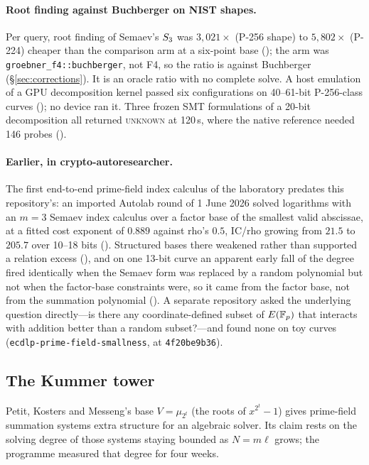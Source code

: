 \paragraph{Root finding against Buchberger on NIST shapes.} Per query, root
finding of Semaev's $S_{3}$ was $3{,}021\times$ (P-256 shape) to
$5{,}802\times$ (P-224) cheaper than the comparison arm at a six-point base
(); the arm was
\texttt{groebner\_f4::buchberger}, not F4, so the ratio is against
Buchberger (\S\ref{sec:corrections}). It is an oracle ratio with no complete
solve. A host emulation of a GPU decomposition kernel passed six
configurations on 40--61-bit P-256-class curves
(); no device ran it.
Three frozen SMT formulations of a 20-bit decomposition all returned
\textsc{unknown} at 120\,s, where the native reference needed 146 probes
().

\paragraph{Earlier, in crypto-autoresearcher.} The first end-to-end
prime-field index calculus of the laboratory predates this repository's:
an imported Autolab round of 1 June 2026 solved logarithms with an $m=3$
Semaev index calculus over a factor base of the smallest valid abscissae, at
a fitted cost exponent of $0.889$ against rho's $0.5$, IC/rho growing from
$21.5$ to $205.7$ over 10--18 bits ().
Structured bases there weakened rather than supported a relation excess
(), and on one 13-bit curve an
apparent early fall of the degree fired identically when the Semaev form
was replaced by a random polynomial but not when the factor-base
constraints were, so it came from the factor base, not from the summation
polynomial (). A separate repository asked the
underlying question directly---is there any coordinate-defined subset of
$E(\mathbb{F}_p)$ that interacts with addition better than a random subset?---and
found none on toy curves (\texttt{ecdlp-prime-field-smallness},
 at \texttt{4f20be9b36}).

\subsection{The Kummer tower}\label{sec:pkm}

Petit, Kosters and Messeng's base $V=\mu_{2^t}$ (the roots of
$x^{2^t}-1$) gives prime-field summation systems extra structure for an
algebraic solver. Its claim rests on the solving degree of those systems
staying bounded as $N=m\ell$ grows; the programme measured that degree for
four weeks.

